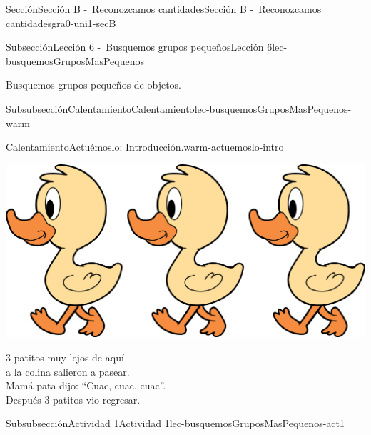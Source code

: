 \documentclass[twoside,10pt,]{article}
\begin{document}
\begin{sectionptx}{Sección}{Sección B -~Reconozcamos cantidades}{}{Sección B -~Reconozcamos cantidades}{}{}{gra0-uni1-secB}
%
%
\typeout{************************************************}
\typeout{************************************************}
%
\begin{subsectionptx}{Subsección}{Lección 6 -~Busquemos grupos pequeños}{}{Lección 6}{}{}{lec-busquemosGruposMasPequenos}
\begin{introduction}{}%
Busquemos grupos pequeños de objetos.%
\end{introduction}%
%
%
\typeout{************************************************}
\typeout{************************************************}
%
\begin{subsubsectionptx}{Subsubsección}{Calentamiento}{}{Calentamiento}{}{}{lec-busquemosGruposMasPequenos-warm}
\begin{exploration}{Calentamiento}{Actuémoslo: Introducción.}{warm-actuemoslo-intro}%
\begin{image}{0.2}{0.6}{0.2}{}%
\includegraphics[width=\linewidth]{external/png-source/3 ducks.png}
\end{image}%
%
\par
3 patitos muy lejos de aquí\\
 a la colina salieron a pasear.\\
 Mamá pata dijo: “Cuac, cuac, cuac”.\\
 Después 3 patitos vio regresar.%
\end{exploration}%
\end{subsubsectionptx}
%
%
\typeout{************************************************}
\typeout{************************************************}
%
\begin{subsubsectionptx}{Subsubsección}{Actividad 1}{}{Actividad 1}{}{}{lec-busquemosGruposMasPequenos-act1}

\end{subsubsectionptx}
\end{subsectionptx}
\end{sectionptx}
\end{document}
